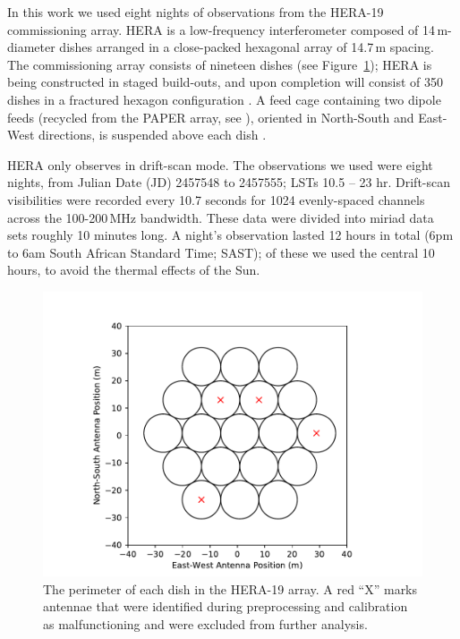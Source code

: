 In this work we used eight nights of observations from the HERA-19 commissioning array. HERA is a low-frequency interferometer composed of 14\,m-diameter dishes arranged in a close-packed hexagonal array of 14.7\,m spacing. The commissioning array consists of nineteen dishes (see Figure~\ref{fig:hera19_antpos}); HERA is being constructed in staged build-outs, and upon completion will consist of 350 dishes in a fractured hexagon configuration \citep[see][]{Dillon.16, deBoer.17}. A feed cage containing two dipole feeds (recycled from the PAPER array, see \citealt{Parsons.10}), oriented in North-South and East-West directions, is suspended above each dish \citep{Neben.16,Ewall-Wice.16.HERA_Dish,Thyagarajan.16}.

HERA only observes in drift-scan mode. The observations we used were eight nights, from Julian Date (JD) 2457548 to 2457555; LSTs 10.5 -- 23 hr. Drift-scan visibilities were recorded every 10.7 seconds for 1024 evenly-spaced channels across the 100-200\,MHz bandwidth. These data were divided into {\sc miriad} data sets roughly 10 minutes long. A night's observation lasted 12 hours in total (6pm to 6am South African Standard Time; SAST); of these we used the central 10 hours, to avoid the thermal effects of the Sun.

\begin{figure}
\centering
\hspace{-0.5cm}\includegraphics[scale=0.6]{chapters/eor_window_HERA/figures/antpos_hera19.pdf}
\caption[The perimeter of each dish in the HERA-19 array.]{The perimeter of each dish in the HERA-19 array.  A red ``X'' marks antennae that were identified during preprocessing and calibration as malfunctioning and were excluded from further analysis.}
\label{fig:hera19_antpos}
\end{figure}

